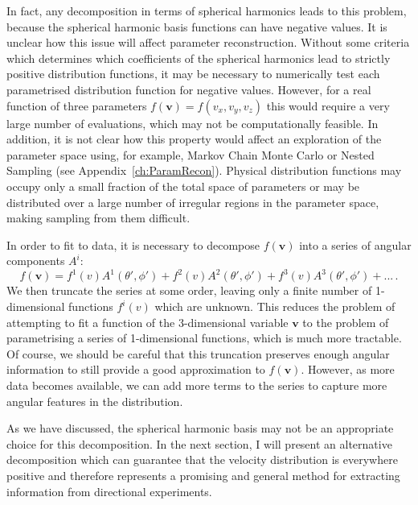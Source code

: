 In fact, any decomposition in terms of spherical harmonics leads to this problem, because the spherical harmonic basis functions can have negative values. It is unclear how this issue will affect parameter reconstruction. Without some criteria which determines which coefficients of the spherical harmonics lead to strictly positive distribution functions, it may be necessary to numerically test each parametrised distribution function for negative values. However, for a real function of three parameters $f(\textbf{v}) = f(v_x, v_y, v_z)$ this would require a very large number of evaluations, which may not be computationally feasible. In addition, it is not clear how this property would affect an exploration of the parameter space using, for example, Markov Chain Monte Carlo or Nested Sampling (see Appendix~\ref{ch:ParamRecon}). Physical distribution functions may occupy only a small fraction of the total space of parameters or may be distributed over a large number of irregular regions in the parameter space, making sampling from them difficult.

In order to fit to data, it is necessary to decompose $f(\textbf{v})$ into a series of angular components $A^i$:
\begin{equation}
f(\textbf{v}) = f^1(v) A^1(\theta',\phi') + f^2(v) A^2(\theta',\phi') +f^3(v) A^3(\theta',\phi') +...\,.
\end{equation}
We then truncate the series at some order, leaving only a finite number of 1-dimensional functions $f^i(v)$ which are unknown. This reduces the problem of attempting to fit a function of the 3-dimensional variable $\textbf{v}$ to the problem of parametrising a series of 1-dimensional functions, which is much more tractable. Of course, we should be careful that this truncation preserves enough angular information to still provide a good approximation to $f(\textbf{v})$. However, as more data becomes available, we can add more terms to the series to capture more angular features in the distribution.

As we have discussed, the spherical harmonic basis may not be an appropriate choice for this decomposition. In the next section, I will present an alternative decomposition which can guarantee that the velocity distribution is everywhere positive and therefore represents a promising and general method for extracting information from directional experiments.


